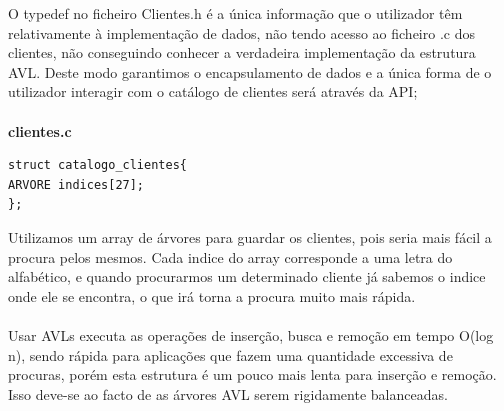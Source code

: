O typedef no ficheiro Clientes.h é a única informação que o utilizador têm relativamente à implementação de dados, não tendo acesso ao ficheiro .c dos clientes, não conseguindo conhecer a verdadeira implementação da estrutura AVL. Deste modo garantimos o encapsulamento de dados e a única forma de o utilizador interagir com o catálogo de clientes será através da API; 


\paragraph{}
\textbf{clientes.c}
\begin{verbatim}
struct catalogo_clientes{
ARVORE indices[27];
};
\end{verbatim}

Utilizamos um array de árvores para guardar os clientes, pois seria mais fácil a procura pelos mesmos. Cada indice do array corresponde a uma letra do alfabético, e quando procurarmos um determinado cliente já sabemos o indice onde ele se encontra, o que irá torna a procura muito mais rápida. 

\paragraph{}

Usar  AVLs  executa as operações de inserção, busca e remoção em tempo O(log n), sendo rápida  para aplicações que fazem uma quantidade excessiva de procuras, porém esta estrutura é um pouco mais lenta para inserção e remoção. Isso deve-se ao facto de as árvores AVL serem rigidamente balanceadas.


